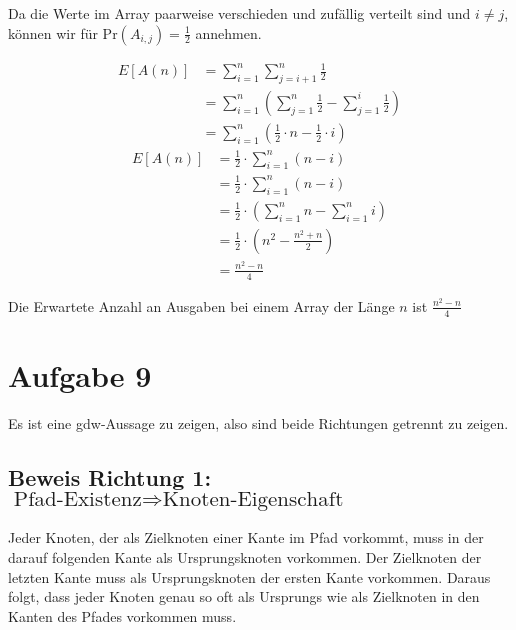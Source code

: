 \documentclass[parskip=half,a4paper]{scrartcl}
\begin{document}
Da die Werte im Array paarweise verschieden und zufällig verteilt sind und $i \neq j$, können wir für $\text{Pr}(A_{i,j}) = \frac{1}{2}$ annehmen.


\begin{equation}
\begin{aligned}
   E\left[A(n)\right] &= \sum_{i=1}^{n}{\sum_{j=i+1}^{n}{\frac{1}{2}}}\\
   &= \sum_{i=1}^{n}{\left(\sum_{j=1}^{n}{\frac{1}{2}} - \sum_{j=1}^{i}{\frac{1}{2}}\right)}\\
   &= \sum_{i=1}^{n}{\left(\frac{1}{2}\cdot n - \frac{1}{2}\cdot i\right)}
\end{aligned}
\end{equation}
\begin{equation}
\begin{aligned}
   E\left[A(n)\right] &= \frac{1}{2} \cdot \sum_{i=1}^{n}{\left(n - i\right)}\\
   &= \frac{1}{2} \cdot \sum_{i=1}^{n}{\left(n - i\right)}\\
   &= \frac{1}{2} \cdot \left(\sum_{i=1}^{n}{n} - \sum_{i=1}^{n}{i}\right)\\
   &= \frac{1}{2} \cdot \left(n^2 - \frac{n^2 + n}{2}\right)\\
   &= \frac{n^2 - n}{4}
\end{aligned}
\end{equation}

Die Erwartete Anzahl an Ausgaben bei einem Array der Länge $n$ ist $\frac{n^2 - n}{4}$

\section*{Aufgabe 9}

Es ist eine gdw-Aussage zu zeigen, also sind beide Richtungen getrennt zu zeigen.

\subsection*{Beweis Richtung 1: $\text{Pfad-Existenz} \Rightarrow \text{Knoten-Eigenschaft}$}

Jeder Knoten, der als Zielknoten einer Kante im Pfad vorkommt, muss in der darauf folgenden Kante als Ursprungsknoten vorkommen. Der Zielknoten der letzten Kante muss als Ursprungsknoten der ersten Kante vorkommen. Daraus folgt, dass jeder Knoten genau so oft als Ursprungs wie als Zielknoten in den Kanten des Pfades vorkommen muss.
\end{document}
